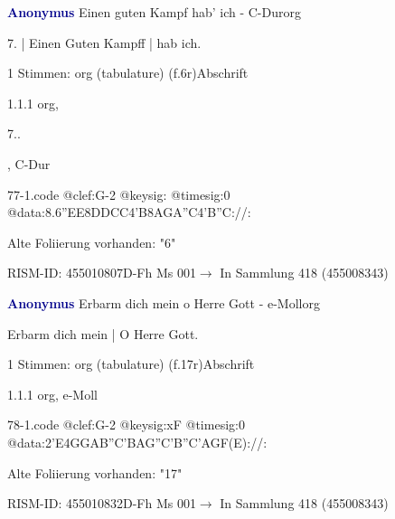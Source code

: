 \documentclass[twocolumn]{book}
\begin{document}
\par \vspace{7pt} \textcolor{darkblue}{\textbf{Anonymus  }}\hfillplus{\textbf{[77]}}\newline Einen guten Kampf hab' ich - C-Dur\newline org
\par \begin{itshape}[f.6r, at left:] 7. | Einen Guten Kampff | hab ich.\end{itshape} 
\par \textcolor{darkblue}{}  1 Stimmen: org (tabulature)  (f.6r)\newline Abschrift
\par 1.1.1  org, \begin{itshape}7..\end{itshape}, C-Dur  
\begin{filecontents*}{77-1.code}
@clef:G-2
@keysig:
@timesig:0
@data:8.6''EE{8DD}{CC}4'B{8AGA''C}4'B''C://:
\end{filecontents*}
\newline
%
\par Alte Foliierung vorhanden: "6"
\par RISM-ID: 455010807\newline D-Fh  Ms 001\newline $\rightarrow$ In Sammlung 418 (455008343)
      
\par \vspace{7pt} \textcolor{darkblue}{\textbf{Anonymus  }}\hfillplus{\textbf{[78]}}\newline Erbarm dich mein o Herre Gott - e-Moll\newline org
\par \begin{itshape}[f.17r, at left:] Erbarm dich mein | O Herre Gott.\end{itshape} 
\par \textcolor{darkblue}{}  1 Stimmen: org (tabulature)  (f.17r)\newline Abschrift
\par 1.1.1  org, e-Moll  
\begin{filecontents*}{78-1.code}
@clef:G-2
@keysig:xF
@timesig:0
@data:2'E4GGAB''C'BAG''C'B''C'AGF(E)://:
\end{filecontents*}
\newline
%
\par Alte Foliierung vorhanden: "17"
\par RISM-ID: 455010832\newline D-Fh  Ms 001\newline $\rightarrow$ In Sammlung 418 (455008343)
      
\end{document}
